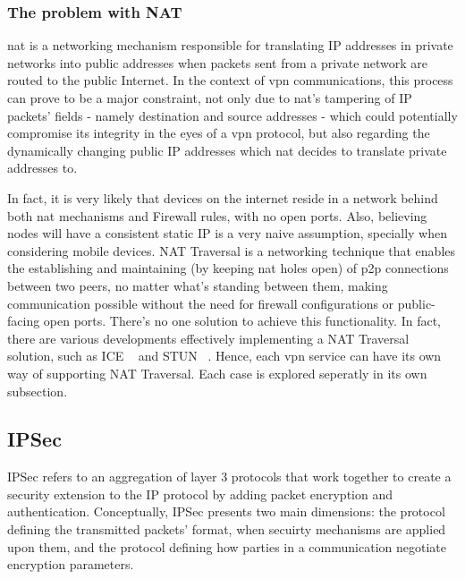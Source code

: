 \documentclass[11pt,twoside,a4paper]{report}
\begin{document}
\subsubsection{The problem with NAT}

\acrfull{nat} is a networking mechanism responsible for translating IP addresses in private networks into public addresses when packets sent from a private network are routed to the public Internet. In the context of \acrshort{vpn} communications, this process can prove to be a major constraint, not only due to \acrshort{nat}'s tampering of IP packets' fields - namely destination and source addresses - which could potentially compromise its integrity in the eyes of a \acrshort{vpn} protocol, but also regarding the dynamically changing public IP addresses which \acrshort{nat} decides to translate private addresses to.

In fact, it is very likely that devices on the internet reside in a network behind both \acrshort{nat} mechanisms and Firewall rules, with no open ports. Also, believing nodes will have a consistent static IP is a very naive assumption, specially when considering mobile devices. NAT Traversal is a networking technique that enables the establishing and maintaining (by keeping \acrshort{nat} holes open) of \acrshort{p2p} connections between two peers, no matter what's standing between them, making communication possible without the need for firewall configurations or public-facing open ports. There's no one solution to achieve this functionality. In fact, there are various developments effectively implementing a NAT Traversal solution, such as ICE ~\cite{rfc8445} and STUN ~\cite{rfc8489}. Hence, each \acrshort{vpn} service can have its own way of supporting NAT Traversal. Each case is explored seperatly in its own subsection.

\subsection{IPSec}

IPSec refers to an aggregation of layer 3 protocols that work together to create a security extension to the IP protocol by adding packet encryption and authentication. Conceptually, IPSec presents two main dimensions: the protocol defining the transmitted packets' format, when secuirty mechanisms are applied upon them, and the protocol defining how parties in a communication negotiate encryption parameters.
\end{document}

